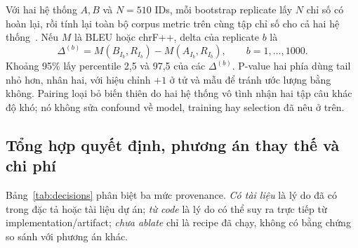 Với hai hệ thống $A,B$ và $N=510$ IDs, mỗi bootstrap replicate lấy $N$ chỉ
số có hoàn lại, rồi tính lại toàn bộ corpus metric trên cùng tập chỉ số cho cả
hai hệ thống~\cite{koehn2004statistical}. Nếu $M$ là BLEU hoặc chrF++, delta
của replicate $b$ là
\begin{equation}
  \Delta^{(b)}=M\!\left(B_{I_b},R_{I_b}\right)
                 -M\!\left(A_{I_b},R_{I_b}\right),
  \qquad b=1,\ldots,1000.
\end{equation}
Khoảng 95\% lấy percentile 2,5 và 97,5 của các $\Delta^{(b)}$. P-value hai
phía dùng tail nhỏ hơn, nhân hai, với hiệu chỉnh $+1$ ở tử và mẫu để tránh
ước lượng bằng không. Pairing loại bỏ biến thiên do hai hệ thống vô tình nhận
hai tập câu khác độ khó; nó không sửa confound về model, training hay
selection đã nêu ở trên.

\subsection{Tổng hợp quyết định, phương án thay thế và chi phí}

Bảng~\ref{tab:decisions} phân biệt ba mức provenance. \emph{Có tài liệu} là lý
do đã có trong đặc tả hoặc tài liệu dự án; \emph{từ code} là lý do có thể suy
ra trực tiếp từ implementation/artifact; \emph{chưa ablate} chỉ là recipe đã
chạy, không có bằng chứng so sánh với phương án khác.

